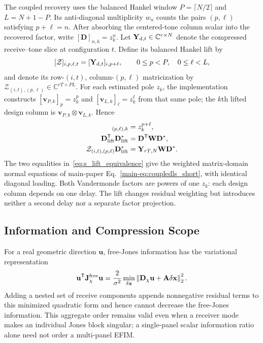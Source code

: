 \documentclass[journal,letterpaper]{IEEEtran}
\newcommand{\C}{\mathbb{C}}
\newcommand{\bx}{\mathbf{x}}
\newcommand{\bu}{\mathbf{u}}
\newcommand{\bv}{\mathbf{v}}
\newcommand{\bA}{\mathbf{A}}
\newcommand{\bD}{\mathbf{D}}
\newcommand{\bJ}{\mathbf{J}}
\newcommand{\bW}{\mathbf{W}}
\newcommand{\bY}{\mathbf{Y}}
\begin{document}
The coupled recovery uses the balanced Hankel window
$P=\lceil N/2\rceil$ and $L=N+1-P$.  Its anti-diagonal multiplicity
$w_n$ counts the pairs $(p,\ell)$ satisfying $p+\ell=n$.  After absorbing the
centered-tone column scalar into the recovered factor, write
$[\bD]_{n,k}=z_k^n$.  Let $\bY_{{\rm d},t}\in\C^{r\times N}$ denote the
compressed receive--tone slice at configuration $t$.  Define its balanced
Hankel lift by
\[
 [\mathcal Z]_{i,p,\ell,t}=[\bY_{{\rm d},t}]_{i,p+\ell},
 \qquad 0\le p<P,\quad 0\le\ell<L,
\]
and denote its row-$(i,t)$, column-$(p,\ell)$ matricization by
$\mathcal Z_{(i,t),(p,\ell)}\in\C^{rT\times PL}$.  For each estimated pole
$z_k$, the implementation constructs
$[\bv_{P,k}]_p=z_k^p$ and $[\bv_{L,k}]_\ell=z_k^\ell$ from that same pole;
the $k$th lifted design column is $\bv_{P,k}\otimes\bv_{L,k}$.  Hence
\begin{align}
 [\bD_{\rm lift}]_{(p,\ell),k}&=z_k^{p+\ell},\nonumber\\
 \bD_{\rm lift}^{\mathsf T}\bD_{\rm lift}^{\ast}
 &=\bD^{\mathsf T}\bW\bD^{\ast},\nonumber\\
 \mathcal Z_{(i,t),(p,\ell)}\bD_{\rm lift}^{\ast}
 &=\bY_{rT,N}\bW\bD^{\ast}.
 \label{eq:s_lift_equivalence}
\end{align}
The two equalities in~\eqref{eq:s_lift_equivalence} give the weighted
matrix-domain normal equations of main-paper
Eq.~\eqref{main-eq:coupledls_short}, with identical diagonal loading.  Both
Vandermonde factors are powers of one $z_k$: each design column depends on
one delay.  The lift changes residual weighting but introduces neither a
second delay nor a separate factor projection.

\subsection{Information and Compression Scope}

For a real geometric direction $\bu$, free-Jones information has the
variational representation
\begin{equation}
 \bu^{\mathsf T}\bJ_\chi^{\rm free}\bu
 =\frac{2}{\sigma^2}\min_{\delta\bx}
 \left\|\bD_\chi\bu+\bA\delta\bx\right\|_2^2.
 \label{eq:s_nested_info}
\end{equation}
Adding a nested set of receive components appends nonnegative residual terms
to this minimized quadratic form and hence cannot decrease the free-Jones
information.  This aggregate order remains valid even when a receiver mode
makes an individual Jones block singular; a single-panel scalar information
ratio alone need not order a multi-panel EFIM.
\end{document}
